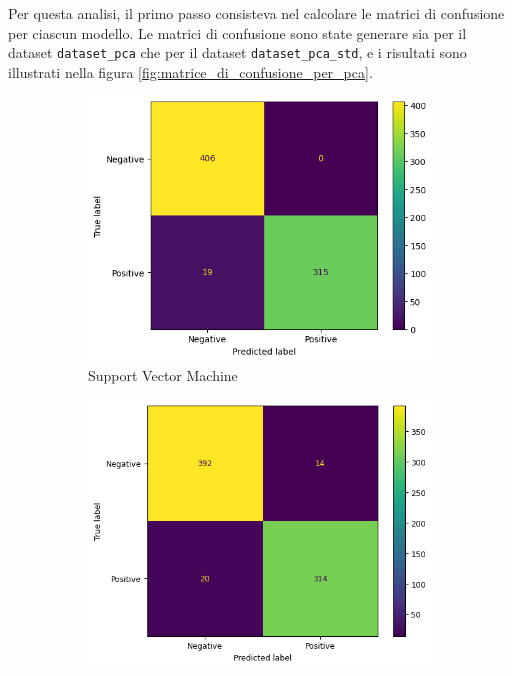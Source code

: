 Per questa analisi, il primo passo consisteva nel calcolare le matrici di
confusione per ciascun modello. Le matrici di confusione sono state generare sia
per il dataset \texttt{dataset\_pca} che per il dataset \texttt{dataset\_pca\_std},
e i risultati sono illustrati nella figura \ref{fig:matrice_di_confusione_per_pca}.
\begin{figure}[!ht]
    \centering
    \begin{subfigure}{0.45\textwidth}
        \centering
        \includegraphics[width=\textwidth]{img/svm/matrice_confusione_pca.png}
        \caption{Support Vector Machine}
        \label{fig:matrice_di_confusione_per_SVM_pca}
    \end{subfigure}
    \hfill
    \begin{subfigure}{.45\textwidth}
        \centering
        \includegraphics[width=\textwidth]{img/gnb/confusion_matrix_pca.png}

\end{subfigure}
\end{figure}

